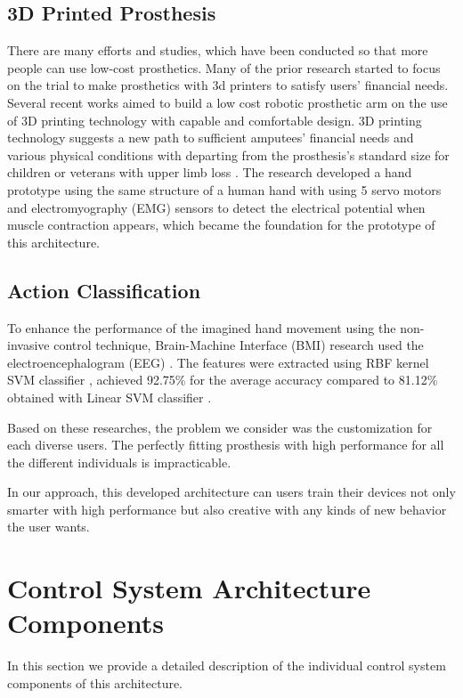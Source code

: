 \documentclass[conference]{IEEEtran}
\begin{document}
\subsection{3D Printed Prosthesis}
There are many efforts and studies, which have been conducted so that more people can use low-cost prosthetics. Many of the prior research started to focus on the trial to make prosthetics with 3d printers to satisfy users' financial needs. Several recent works \cite{3D2}\cite{3D4} aimed to build a low cost robotic prosthetic arm on the use of 3D printing technology with capable and comfortable design. 3D printing technology suggests a new path to sufficient amputees' financial needs and various physical conditions with departing from the prosthesis's standard size for children or veterans with upper limb loss \cite{3D3}. The research \cite{3D1} developed a hand prototype using the same structure of a human hand with using 5 servo motors and electromyography (EMG) sensors to detect the electrical potential when muscle contraction appears, which became the foundation for the prototype of this architecture. 

\subsection{Action Classification}
To enhance the performance of the imagined hand movement using the non-invasive control technique, Brain-Machine Interface (BMI) research used the electroencephalogram (EEG) \cite{EEG}. The features were extracted using RBF kernel SVM classifier \cite{ML1}\cite{ML2}, achieved 92.75\% for the average accuracy compared to 81.12\% obtained with Linear SVM classifier \cite{EEG}. 


Based on these researches, the problem we consider was the customization for each diverse users. The perfectly fitting prosthesis with high performance for all the different individuals is impracticable.

In our approach, this developed architecture can users train their devices not only smarter with high performance but also creative with any kinds of new behavior the user wants.


\section{Control System Architecture Components}
In this section we provide a detailed description of the individual control system components of this architecture.
\end{document}
